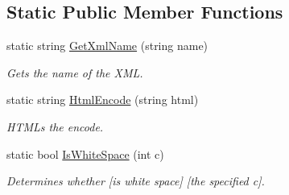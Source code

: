 \subsection*{Static Public Member Functions}
\begin{DoxyCompactItemize}
\item 
static string \hyperlink{class_html_agility_pack_1_1_html_document_af507693cf3163da776a2f12feb4ea5ce}{Get\+Xml\+Name} (string name)
\begin{DoxyCompactList}\small\item\em Gets the name of the X\+ML. \end{DoxyCompactList}\item 
static string \hyperlink{class_html_agility_pack_1_1_html_document_a0fcf3caaf1a43613da81853b334cb6b0}{Html\+Encode} (string html)
\begin{DoxyCompactList}\small\item\em H\+T\+M\+Ls the encode. \end{DoxyCompactList}\item 
static bool \hyperlink{class_html_agility_pack_1_1_html_document_a133cce0bd1abffb920568b6412736f89}{Is\+White\+Space} (int c)
\begin{DoxyCompactList}\small\item\em Determines whether \mbox{[}is white space\mbox{]} \mbox{[}the specified c\mbox{]}. \end{DoxyCompactList}\end{DoxyCompactItemize}
